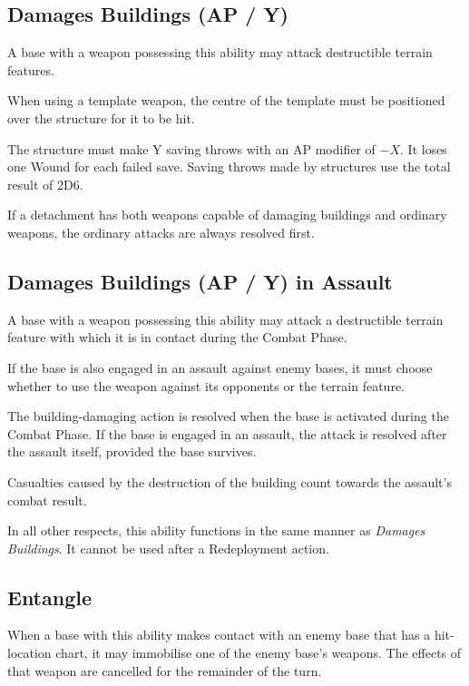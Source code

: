 \subsection{Damages Buildings (AP  / Y)}

A base with a weapon possessing this ability may attack destructible terrain features.

When using a template weapon, the centre of the template must be positioned over the structure for it to be hit.

The structure must make Y saving throws with an AP modifier of $-X$. It loses one Wound for each failed save. Saving throws made by structures use the total result of 2D6.

If a detachment has both weapons capable of damaging buildings and ordinary weapons, the ordinary attacks are always resolved first.

\subsection{Damages Buildings (AP  / Y) in Assault}

A base with a weapon possessing this ability may attack a destructible terrain feature with which it is in contact during the Combat Phase.

If the base is also engaged in an assault against enemy bases, it must choose whether to use the weapon against its opponents or the terrain feature.

The building-damaging action is resolved when the base is activated during the Combat Phase. If the base is engaged in an assault, the attack is resolved after the assault itself, provided the base survives.

Casualties caused by the destruction of the building count towards the assault's combat result.

In all other respects, this ability functions in the same manner as \textit{Damages Buildings}. It cannot be used after a Redeployment action.

\subsection{Entangle}

When a base with this ability makes contact with an enemy base that has a hit-location chart, it may immobilise one of the enemy base's weapons. The effects of that weapon are cancelled for the remainder of the turn.

